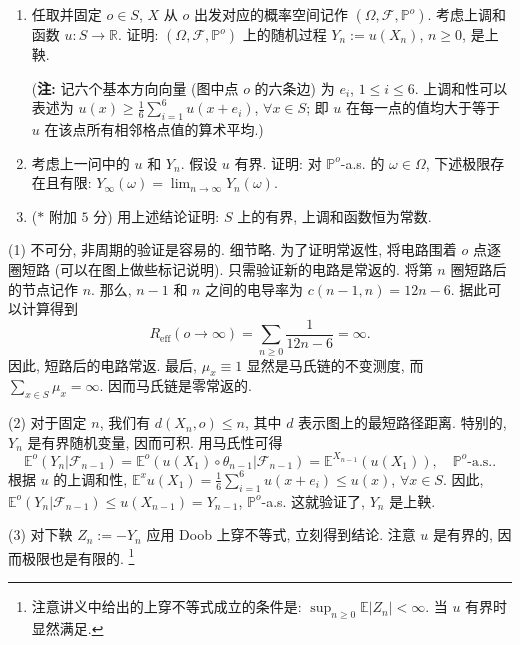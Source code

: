 \begin{enumerate}
\begin{enumerate}[label=(\arabic*)]
        \item 任取并固定 $o\in S$, $X$ 从 $o$ 出发对应的概率空间记作
        $(\Omega,\mathscr F,\mathbb P^o)$. 考虑上调和函数 $u:S\to\mathbb R$. 证明:
        $(\Omega,\mathscr F,\mathbb P^o)$ 上的随机过程 $Y_n:=u(X_n)$, $n\geq 0$, 是上鞅.

        (\textbf{注:} 记六个基本方向向量 (图中点 $o$ 的六条边) 为 $e_i$, $1\leq i\leq 6$.
        上调和性可以表述为 $u(x)\geq \frac16\sum_{i=1}^6u(x+e_i)$, $\forall x\in S$;
        即 $u$ 在每一点的值均大于等于 $u$ 在该点所有相邻格点值的算术平均.)

        \item 考虑上一问中的 $u$ 和 $Y_n$. 假设 $u$ 有界. 证明: 对 $\mathbb P^o$-a.s. 的
        $\omega\in\Omega$, 下述极限存在且有限: $Y_\infty(\omega)=\lim_{n\to\infty}Y_n(\omega)$.

        \item ($*$ 附加 $5$ 分) 用上述结论证明: $S$ 上的有界, 上调和函数恒为常数.
    \end{enumerate}

    \begin{proofc}[证明]
        (1) 不可分, 非周期的验证是容易的. 细节略. 
        为了证明常返性, 将电路围着 $o$ 点逐圈短路 (可以在图上做些标记说明). 只需验证新的电路是常返的. 
        将第 $n$ 圈短路后的节点记作 $n$. 那么, $n-1$ 和 $n$ 之间的电导率为 $c(n-1,n)=12n-6$. 据此可以计算得到
        \[
            R_{\mathrm{eff}}(o\to\infty)=\sum_{n\geq 0}\frac{1}{12n-6}=\infty.
        \]
        因此, 短路后的电路常返. 最后, $\mu_x\equiv 1$ 显然是马氏链的不变测度, 而
        $\sum_{x\in S}\mu_x=\infty$. 因而马氏链是零常返的.

        (2) 对于固定 $n$, 我们有 $d(X_n,o)\leq n$, 其中 $d$ 表示图上的最短路径距离.
        特别的, $Y_n$ 是有界随机变量, 因而可积. 用马氏性可得
        \[
            \mathbb E^o(Y_n|\mathscr F_{n-1})
            =\mathbb E^o(u(X_1)\circ\theta_{n-1}|\mathscr F_{n-1})
            =\mathbb E^{X_{n-1}}(u(X_1)),\quad \mathbb P^o\text{-a.s.}.
        \]
        根据 $u$ 的上调和性,
        $\mathbb E^x u(X_1)=\frac16\sum_{i=1}^6u(x+e_i)\leq u(x)$, $\forall x\in S$.
        因此, $\mathbb E^o(Y_n|\mathscr F_{n-1})\leq u(X_{n-1})=Y_{n-1}$,
        $\mathbb P^o$-a.s. 这就验证了, $Y_n$ 是上鞅.

        (3) 对下鞅 $Z_n:=-Y_n$ 应用 Doob 上穿不等式, 立刻得到结论. 
        注意 $u$ 是有界的, 因而极限也是有限的. 
        \footnote{注意讲义中给出的上穿不等式成立的条件是:
        $\sup_{n\geq 0}\mathbb E|Z_n|<\infty$. 当 $u$ 有界时显然满足.}


\end{proofc}
\end{enumerate}
